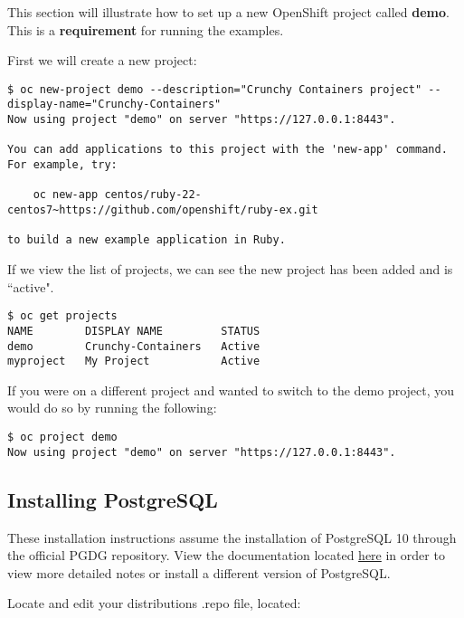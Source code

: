 \documentclass[letterpaper,12pt]{article}
\begin{document}
This section will illustrate how to set up a new OpenShift project called \textbf{demo}. This is a \textbf{requirement} for running the examples.

First we will create a new project:
\vspace{.75em}
\begin{lstlisting}
$ oc new-project demo --description="Crunchy Containers project" --display-name="Crunchy-Containers"
Now using project "demo" on server "https://127.0.0.1:8443".

You can add applications to this project with the 'new-app' command. For example, try:

    oc new-app centos/ruby-22-centos7~https://github.com/openshift/ruby-ex.git

to build a new example application in Ruby.
\end{lstlisting}

If we view the list of projects, we can see the new project has been added and is ``active".
\vspace{.75em}
\begin{lstlisting}
$ oc get projects
NAME        DISPLAY NAME         STATUS
demo        Crunchy-Containers   Active
myproject   My Project           Active
\end{lstlisting}

If you were on a different project and wanted to switch to the demo project, you would do so by running the following:
\vspace{.75em}
\begin{lstlisting}
$ oc project demo
Now using project "demo" on server "https://127.0.0.1:8443".
\end{lstlisting}

\subsection{Installing PostgreSQL}\label{/_project_setup/_installing_postgresql}

These installation instructions assume the installation of PostgreSQL 10 through the official PGDG repository. View the documentation located \href{https://wiki.postgresql.org/wiki/YUM\_Installation}{here} in order to view more detailed notes or install a different version of PostgreSQL.

Locate and edit your distributions .repo file, located:
\end{document}
